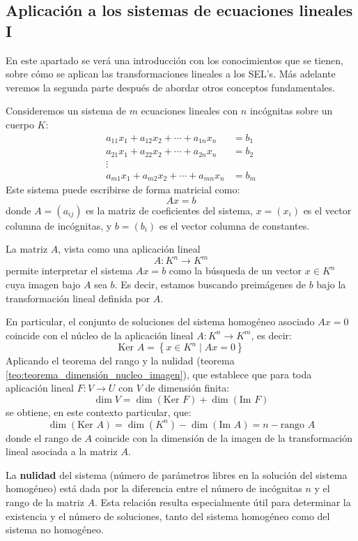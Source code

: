 \subsection{Aplicación a los sistemas de ecuaciones lineales I}
\label{sec:appl_sels_1}

\begin{tcolorbox}[remember, title=Aclaración]
  En este apartado se verá una introducción con los conocimientos que se tienen, sobre cómo se aplican las transformaciones lineales a los SEL's. Más adelante veremos la segunda parte después de abordar otros conceptos fundamentales.
\end{tcolorbox}

Consideremos un sistema de \(m\) ecuaciones lineales con \(n\) incógnitas sobre un cuerpo \(K\):
\begin{align*}
  a_{11} x_1 + a_{12} x_2 + \cdots + a_{1n} x_n &= b_1 \\
  a_{21} x_1 + a_{22} x_2 + \cdots + a_{2n} x_n &= b_2\\
  \vdots  \qquad \qquad ~ & \\
  a_{m1} x_1 + a_{m2} x_2 + \cdots + a_{mn} x_n &= b_m
\end{align*}
Este sistema puede escribirse de forma matricial como:
\[
  A x = b
\]
donde \(A = (a_{ij})\) es la matriz de coeficientes del sistema, \(x = (x_i)\) es el vector columna de incógnitas, y \(b = (b_i)\) es el vector columna de constantes.

La matriz \(A\), vista como una aplicación lineal
\[
  A: K^n \rightarrow K^m
\]
permite interpretar el sistema \(Ax = b\) como la búsqueda de un vector \(x \in K^n\) cuya imagen bajo \(A\) sea \(b\). Es decir, estamos buscando preimágenes de \(b\) bajo la transformación lineal definida por \(A\).

En particular, el conjunto de soluciones del sistema homogéneo asociado \(Ax = 0\) coincide con el núcleo de la aplicación lineal \(A: K^n \to K^m\), es decir:
\[
  \text{Ker } A = \left\{ x \in K^n \mid Ax = 0 \right\}
\]
Aplicando el teorema del rango y la nulidad (teorema \ref{teo:teorema_dimensión_nucleo_imagen}), que establece que para toda aplicación lineal \(F: V \rightarrow U\) con \(V\) de dimensión finita:
\[
  \dim V = \dim(\text{Ker } F) + \dim(\text{Im } F)
\]
se obtiene, en este contexto particular, que:
\[
  \dim(\text{Ker } A) = \dim(K^n) - \dim(\text{Im } A) = n - \text{rango } A
\]
donde el rango de \(A\) coincide con la dimensión de la imagen de la transformación lineal asociada a la matriz \(A\).

\begin{tcolorbox}[title=Interpretación]
  La \textbf{nulidad} del sistema (número de parámetros libres en la solución del sistema homogéneo) está dada por la diferencia entre el número de incógnitas \(n\) y el rango de la matriz \(A\). Esta relación resulta especialmente útil para determinar la existencia y el número de soluciones, tanto del sistema homogéneo como del sistema no homogéneo.
\end{tcolorbox}
